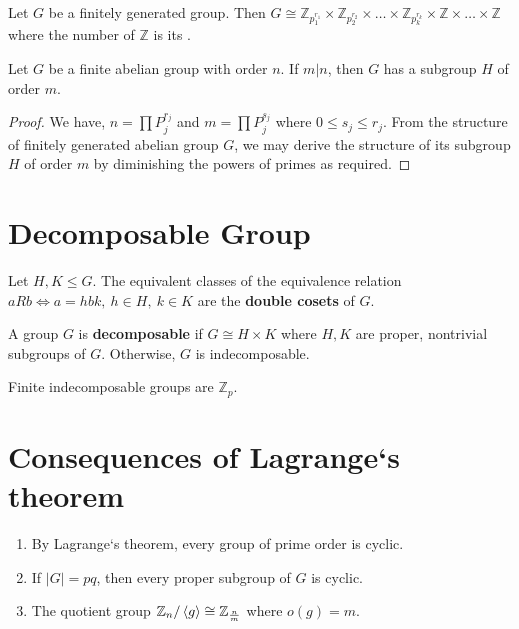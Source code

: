 \begin{theorem}
	Let $G$ be a finitely generated group.
	Then $G \cong \mathbb{Z}_{p_1^{r_1}} \times \mathbb{Z}_{p_2^{r_2}} \times \dots \times \mathbb{Z}_{p_k^{r_k}} \times \mathbb{Z} \times \dots \times \mathbb{Z}$ where the number of $\mathbb{Z}$ is its .
\end{theorem}

\begin{theorem}
	Let $G$ be a finite abelian group with order $n$. If $m|n$, then $G$ has a subgroup $H$ of order $m$.
\end{theorem}
\begin{proof}
	We have, $n = \prod P_j^{r_j}$ and $m = \prod P_j^{s_j}$ where $0 \le s_j \le r_j$.
	From the structure of finitely generated abelian group $G$, we may derive the structure of its subgroup $H$ of order $m$ by diminishing the powers of primes as required.
\end{proof}


\section{Decomposable Group}
\begin{definition}
	Let $H,K \le G$.
	The equivalent classes of the equivalence relation $aRb \iff a = hbk,\ h \in H,\ k \in K$ are the \textbf{double cosets} of $G$.
\end{definition}

\begin{definition}
	A group $G$ is \textbf{decomposable} if $G \cong H \times K$ where $H,K$ are proper, nontrivial subgroups of $G$.
	Otherwise, $G$ is indecomposable.
\end{definition}
	Finite indecomposable groups are $\mathbb{Z}_p$.

\section{Consequences of Lagrange`s theorem}
\begin{enumerate}
	\item By Lagrange`s theorem, every group of prime order is cyclic.
	\item If $|G|=pq$, then every proper subgroup of $G$ is cyclic.
	\item The quotient group $\mathbb{Z}_n/\left\langle g \right\rangle \cong \mathbb{Z}_\frac{n}{m}$ where $o(g)=m$.
\end{enumerate}

